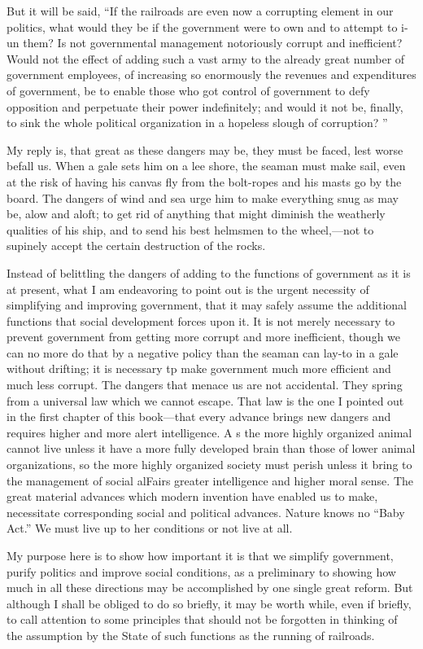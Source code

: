 \documentclass{book}
\begin{document}
But it will be said, “If the railroads are even now a corrupting element in our politics, what would they be if the government were to own and to attempt to i-un them? Is not governmental management notoriously corrupt and inefficient? Would not the effect of adding such a vast army to the already great number of government employees, of increasing so enormously the revenues and expenditures of government, be to enable those who got control of government to defy opposition and perpetuate their power indefinitely; and would it not be, finally, to sink the whole political organization in a hopeless slough of corruption? ”

My reply is, that great as these dangers may be, they must be faced, lest worse befall us. When a gale sets him on a lee shore, the seaman must make sail, even at the risk of having his canvas fly from the bolt-ropes and his masts go by the board. The dangers of wind and sea urge him to make everything snug as may be, alow and aloft; to get rid of anything that might diminish the weatherly qualities of his ship, and to send his best helmsmen to the wheel,—not to supinely accept the certain destruction of the rocks.

Instead of belittling the dangers of adding to the functions of government as it is at present, what I am endeavoring to point out is the urgent necessity of simplifying and improving government, that it may safely assume the additional functions that social development forces upon it. It is not merely necessary to prevent government from getting more corrupt and more inefficient, though we can no more do that by a negative policy than the seaman can lay-to in a gale without drifting; it is necessary tp make government much more efficient and much less corrupt. The dangers that menace us are not accidental. They spring from a universal law which we cannot escape. That law is the one I pointed out in the first chapter of this book—that every advance brings new dangers and requires higher and more alert intelligence. A s the more highly organized animal cannot live unless it have a more fully developed brain than those of lower animal organizations, so the more highly organized society must perish unless it bring to the management of social alFairs greater intelligence and higher moral sense. The great material advances which modern invention have enabled us to make, necessitate corresponding social and political advances. Nature knows no “Baby Act.” We must live up to her conditions or not live at all.

My purpose here is to show how important it is that we simplify government, purify politics and improve social conditions, as a preliminary to showing how much in all these directions may be accomplished by one single great reform. But although I shall be obliged to do so briefly, it may be worth while, even if briefly, to call attention to some principles that should not be forgotten in thinking of the assumption by the State of such functions as the running of railroads.
\end{document}
